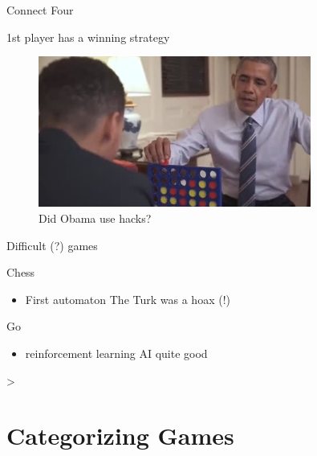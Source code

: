 \documentclass[compress]{beamer}
\newcommand{\bblue}[1]{\textcolor{NordBrightBlue}{#1}}
\newcommand{\yellow}[1]{\textcolor{NordYellow}{#1}}
\begin{document}
\begin{frame}{Connect Four}

1st player has a winning strategy
\medskip
\begin{figure}
    \centering
    \includegraphics[width=0.8\textwidth]{img/obama_connect_four.jpg}
    \caption{Did Obama use hacks?}
    \label{fig:obama_connect_four}
\end{figure}
\end{frame}

\begin{frame}{Difficult (?) games}

\begin{description}
\item \bblue{Chess}
\begin{itemize}
    \item First automaton \yellow{The Turk} was a hoax (!)
\end{itemize}
\item \bblue{Go}
\begin{itemize}
    \item reinforcement learning AI quite good
\end{itemize}
\end{description}
\bigskip
\begin{center}
{\Large {}  >  }
\end{center}
\end{frame}

\section{Categorizing Games}
\end{document}
